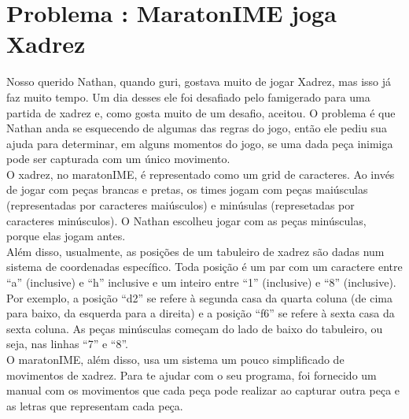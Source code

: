 \section*{Problema \proxLetra: MaratonIME joga Xadrez}

Nosso querido Nathan, quando guri, gostava muito de jogar Xadrez, mas isso já faz muito tempo. Um dia desses ele foi desafiado pelo famigerado \@luisgust para uma partida de xadrez e, como gosta muito de um desafio, aceitou. O problema é que Nathan anda se esquecendo de algumas das regras do jogo, então ele pediu sua ajuda para determinar, em alguns momentos do jogo, se uma dada peça inimiga pode ser capturada com um único movimento. \\
O xadrez, no maratonIME, é representado como um grid de caracteres. Ao invés de jogar com peças brancas e pretas, os times jogam com peças maiúsculas (representadas por caracteres maiúsculos) e minúsulas (represetadas por caracteres minúsculos). O Nathan escolheu jogar com as peças minúsculas, porque elas jogam antes. \\
Além disso, usualmente, as posições de um tabuleiro de xadrez são dadas num sistema de coordenadas específico. Toda posição é um par com um caractere entre ``a'' (inclusive) e ``h'' inclusive e um inteiro entre ``1'' (inclusive) e ``8'' (inclusive). Por exemplo, a posição ``d2'' se refere à segunda casa da quarta coluna (de cima para baixo, da esquerda para a direita) e a posição ``f6'' se refere à sexta casa da sexta coluna. As peças minúsculas começam do lado de baixo do tabuleiro, ou seja, nas linhas ``7'' e ``8''. \\
O maratonIME, além disso, usa um sistema um pouco simplificado de movimentos de xadrez. Para te ajudar com o seu programa, foi fornecido um manual com os movimentos que cada peça pode realizar ao capturar outra peça e as letras que representam cada peça. \\
